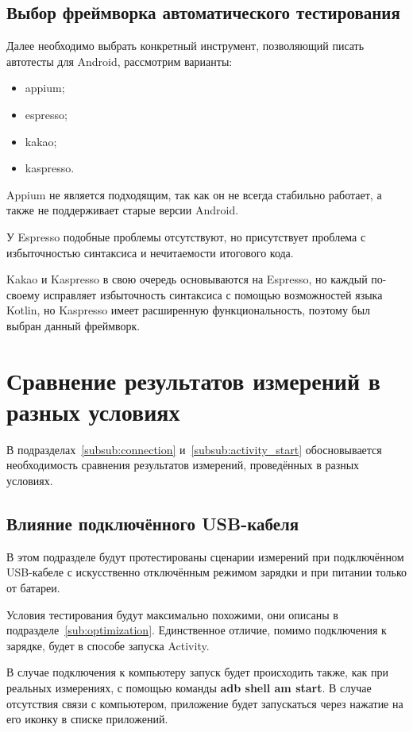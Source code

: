 \documentclass[a4paper,14pt]{extarticle} %
\begin{document}
	\subsection{Выбор фреймворка автоматического тестирования}
	
	Далее необходимо выбрать конкретный инструмент, позволяющий писать автотесты для Android, рассмотрим варианты:
	\begin{itemize}
		\item appium;
		\item espresso;
		\item kakao;
		\item kaspresso.
	\end{itemize}
	
	Appium не является подходящим, так как он не всегда стабильно работает, а также не поддерживает старые версии Android. 
	
	У Espresso подобные проблемы отсутствуют, но присутствует проблема с избыточностью синтаксиса и нечитаемости итогового кода. 
	
	Kakao и Kaspresso в свою очередь основываются на Espresso, но каждый по-своему исправляет избыточность синтаксиса с помощью возможностей языка Kotlin, но Kaspresso имеет расширенную функциональность, поэтому был выбран данный фреймворк.
	
	\clearpage
	\section{Сравнение результатов измерений в разных условиях}
	
	В подразделах~\ref{subsub:connection} и~\ref{subsub:activity_start} обосновывается необходимость сравнения результатов измерений, проведённых в разных условиях.
	
	\subsection{Влияние подключённого USB-кабеля} \label{sub:nousb_test}
	
	В этом подразделе будут протестированы сценарии измерений при подключённом USB-кабеле с искусственно отключённым режимом зарядки и при питании только от батареи.
	
	Условия тестирования будут максимально похожими, они описаны в подразделе~\ref{sub:optimization}. Единственное отличие, помимо подключения к зарядке, будет в способе запуска Activity. 
	
	В случае подключения к компьютеру запуск будет происходить также, как при реальных измерениях, с помощью команды \textbf{adb shell am start}. В случае отсутствия связи с компьютером, приложение будет запускаться через нажатие на его иконку в списке приложений.
	
\end{document}
